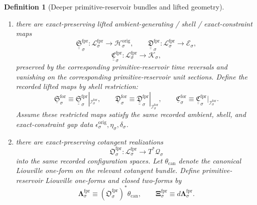 \documentclass[11pt]{article}
\newcommand{\ConfigSpace}[1]{\mathcal Q_{#1}}
\newcommand{\ShellTarget}[1]{\mathcal E_{#1}}
\newcommand{\ShellGap}[1]{\eta_{#1}}
\newcommand{\ConstraintTarget}[1]{\mathcal K_{#1}}
\newcommand{\ConstraintGap}[1]{\delta_{#1}}
\newcommand{\OriginTarget}[1]{\mathcal H_{#1}^{\mathrm{orig}}}
\newcommand{\OriginGap}[1]{\epsilon_{#1}^{\mathrm{orig}}}
\newcommand{\RootGap}[1]{\kappa_{#1}^{\mathrm{root}}}
\newcommand{\PrimGap}[1]{\lambda_{#1}^{\mathrm{prim}}}
\newcommand{\SubprimGap}[1]{\mu_{#1}^{\mathrm{subprim}}}
\newcommand{\ProtoSubprimGap}[1]{\nu_{#1}^{\mathrm{psp}}}
\newcommand{\ForSpace}[1]{\mathcal I_{#1}^{\mathrm{for}}}
\newcommand{\ForLiftedPrimitive}[1]{\underline{\mathfrak G}_{#1}^{\mathrm{for}}}
\newcommand{\ForLiftedRoot}[1]{\underline{\mathfrak P}_{#1}^{\mathrm{for}}}
\newcommand{\ForLiftedPreAmbient}[1]{\underline{\mathfrak Z}_{#1}^{\mathrm{for}}}
\newcommand{\ForLiftedAmbient}[1]{\underline{\mathfrak S}_{#1}^{\mathrm{for}}}
\newcommand{\ForLiftedShell}[1]{\underline{\mathfrak D}_{#1}^{\mathrm{for}}}
\newcommand{\ForConstraintMap}[1]{\underline{\mathfrak C}_{#1}^{\mathrm{for}}}
\newcommand{\ForPrimSpace}[1]{\mathcal L_{#1}^{\mathrm{fpr}}}
\newcommand{\ForPrimLiftedPrimitive}[1]{\underline{\underline{\mathfrak G}}_{#1}^{\mathrm{fpr}}}
\newcommand{\ForPrimLiftedRoot}[1]{\underline{\underline{\mathfrak P}}_{#1}^{\mathrm{fpr}}}
\newcommand{\ForPrimLiftedPreAmbient}[1]{\underline{\underline{\mathfrak Z}}_{#1}^{\mathrm{fpr}}}
\newcommand{\ForPrimLiftedAmbient}[1]{\underline{\underline{\mathfrak S}}_{#1}^{\mathrm{fpr}}}
\newcommand{\ForPrimLiftedShell}[1]{\underline{\underline{\mathfrak D}}_{#1}^{\mathrm{fpr}}}
\newcommand{\ForPrimConstraintMap}[1]{\underline{\underline{\mathfrak C}}_{#1}^{\mathrm{fpr}}}
\newcommand{\ForPrimCotangentRealization}[1]{\mathfrak O_{#1}^{\mathrm{fpr}}}
\newcommand{\ForPrimLiouville}[1]{\boldsymbol{\Lambda}_{#1}^{\mathrm{fpr}}}
\newcommand{\ForPrimTwo}[1]{\boldsymbol{\Xi}_{#1}^{\mathrm{fpr}}}
\newtheorem{definition}{Definition}
\begin{document}
\begin{definition}[Deeper primitive-reservoir bundles and lifted geometry]
\begin{enumerate}
\begin{equation}
    \ForLiftedPrimitive{\sigma}\equiv \ForPrimLiftedPrimitive{\sigma}|_{\ForSpace{\sigma}},
    \label{eq:forcing_subprimitive_primitive_from_reservoir}
    \end{equation}
    \begin{equation}
    \ForLiftedRoot{\sigma}\equiv \ForPrimLiftedRoot{\sigma}|_{\ForSpace{\sigma}},\qquad
    \ForLiftedPreAmbient{\sigma}\equiv \ForPrimLiftedPreAmbient{\sigma}|_{\ForSpace{\sigma}}.
    \label{eq:forcing_root_preambient_from_reservoir}
    \end{equation}
    Assume these restricted maps satisfy the same recorded positive descendant gap bounds \(\ProtoSubprimGap{\sigma},\SubprimGap{\sigma},\PrimGap{\sigma},\RootGap{\sigma}\) on the current descendant shells.
    \item there are exact-preserving lifted ambient-generating / shell / exact-constraint maps
    \[
    \ForPrimLiftedAmbient{\sigma}:\ForPrimSpace{\sigma}\to\OriginTarget{\sigma},\qquad
    \ForPrimLiftedShell{\sigma}:\ForPrimSpace{\sigma}\to\ShellTarget{\sigma},
    \]
    \[
    \ForPrimConstraintMap{\sigma}:\ForPrimSpace{\sigma}\to\ConstraintTarget{\sigma},
    \]
    preserved by the corresponding primitive-reservoir time reversals and vanishing on the corresponding primitive-reservoir unit sections. Define the recorded lifted maps by shell restriction:
    \begin{equation}
    \ForLiftedAmbient{\sigma}\equiv \ForPrimLiftedAmbient{\sigma}|_{\ForSpace{\sigma}},\qquad
    \ForLiftedShell{\sigma}\equiv \ForPrimLiftedShell{\sigma}|_{\ForSpace{\sigma}},\qquad
    \ForConstraintMap{\sigma}\equiv \ForPrimConstraintMap{\sigma}|_{\ForSpace{\sigma}}.
    \label{eq:forcing_remaining_lifts_from_reservoir}
    \end{equation}
    Assume these restricted maps satisfy the same recorded ambient, shell, and exact-constraint gap data \(\OriginGap{\sigma},\ShellGap{\sigma},\ConstraintGap{\sigma}\).
    \item there are exact-preserving cotangent realizations
    \[
    \ForPrimCotangentRealization{\sigma}:\ForPrimSpace{\sigma}\to T^*\ConfigSpace{\sigma}
    \]
    into the same recorded configuration spaces. Let \(\theta_{\mathrm{can}}\) denote the canonical Liouville one-form on the relevant cotangent bundle. Define primitive-reservoir Liouville one-forms and closed two-forms by
    \begin{equation}
    \ForPrimLiouville{\sigma}\equiv (\ForPrimCotangentRealization{\sigma})^*\theta_{\mathrm{can}},
    \qquad
    \ForPrimTwo{\sigma}\equiv d\ForPrimLiouville{\sigma}.

\end{equation}
\end{enumerate}
\end{definition}
\end{document}
